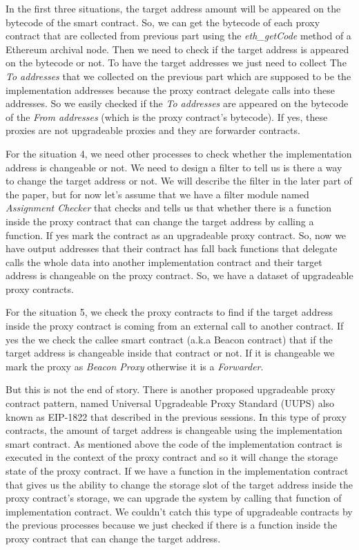 In the first three situations, the target address amount will be appeared on the bytecode of the smart contract. So, we can get the bytecode of each proxy contract that are collected from previous part using the \textit{eth\_getCode} method of a Ethereum archival node. Then we need to check if the target address is appeared on the bytecode or not. To have the target addresses we just need to collect The \textit{To addresses} that we collected on the previous part which are supposed to be the implementation addresses because the proxy contract delegate calls into these addresses. So we easily checked if the \textit{To addresses} are appeared on the bytecode of the \textit{From addresses} (which is the proxy contract's bytecode). If yes, these proxies are not upgradeable proxies and they are forwarder contracts.

For the situation 4, we need other processes to check whether the implementation address is changeable or not. We need to design a filter to tell us is there a way to change the target address or not. We will describe the filter in the later part of the paper, but for now let's assume that we have a filter module named \textit{Assignment Checker} that checks and tells us that whether there is a function inside the proxy contract that can change the target address by calling a function. If yes mark the contract as an upgradeable proxy contract. So, now we have output addresses that their contract has fall back functions that delegate calls the whole data into another implementation contract and their target address is changeable on the proxy contract. So, we have a dataset of upgradeable proxy contracts.

For the situation 5, we check the proxy contracts to find if the target address inside the proxy contract is coming from an external call to another contract. If yes the we check the callee smart contract (a.k.a Beacon contract) that if the target address is changeable inside that contract or not. If it is changeable we mark the proxy as \textit{Beacon Proxy} otherwise it is a \textit{Forwarder}. 

But this is not the end of story. There is another proposed upgradeable proxy contract pattern, named Universal Upgradeable Proxy Standard (UUPS) also known as EIP-1822 that described in the previous sessions. In this type of proxy contracts, the amount of target address is changeable using the implementation smart contract. As mentioned above the code of the implementation contract is executed in the context of the proxy contract and so it will change the storage state of the proxy contract. If we have a function in the implementation contract that gives us the ability to change the storage slot of the target address inside the proxy contract's storage, we can upgrade the system by calling that function of implementation contract. We couldn't catch this type of upgradeable contracts by the previous processes because we just checked if there is a function inside the proxy contract that can change the target address.

